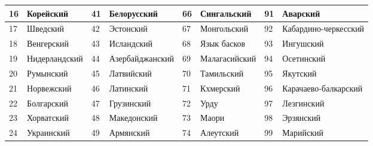 \documentclass[12pt, twoside]{article}
\begin{document}
\begin{table}[H]
\begin{tabular}{|l|l|l|l|l|l|l|l|}
16 & Корейский     & 41 & Белорусский      & 66 & Сингальский   & 91 & Аварский             \\ \hline
17 & Шведский      & 42 & Эстонский        & 67 & Монгольский   & 92 & Кабардино-черкесский \\ \hline
18 & Венгерский    & 43 & Исландский       & 68 & Язык басков   & 93 & Ингушский            \\ \hline
19 & Нидерландский & 44 & Азербайджанский  & 69 & Малагасийский & 94 & Осетинский           \\ \hline
20 & Румынский     & 45 & Латвийский       & 70 & Тамильский    & 95 & Якутский             \\ \hline
21 & Норвежский    & 46 & Латинский        & 71 & Кхмерский     & 96 & Карачаево-балкарский \\ \hline
22 & Болгарский    & 47 & Грузинский       & 72 & Урду          & 97 & Лезгинский           \\ \hline
23 & Хорватский    & 48 & Македонский      & 73 & Маори         & 98 & Эрзянский            \\ \hline
24 & Украинский    & 49 & Армянский        & 74 & Алеутский     & 99 & Марийский            \\ \hline
\end{tabular}
\end{table}
\end{document}
